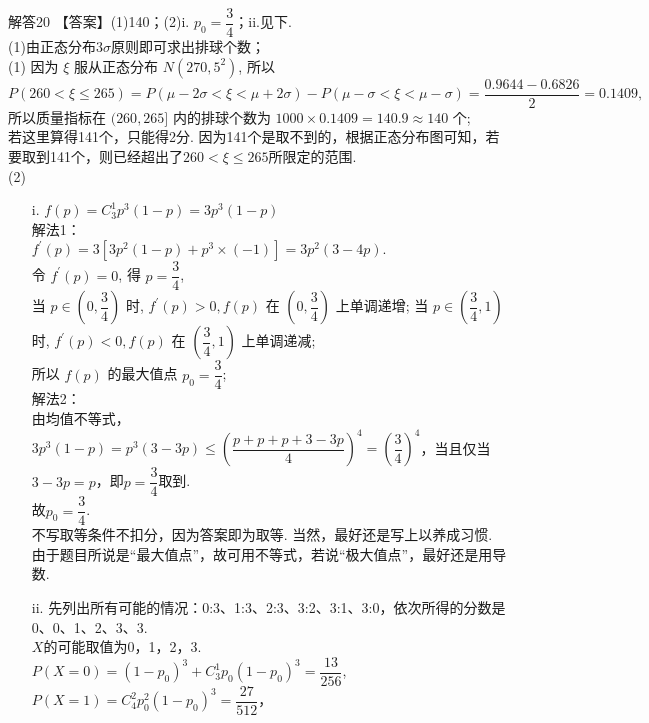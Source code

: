 \documentclass[11pt]{article}
\begin{document}
\heiti 解答20 \songti 【答案】(1)140；(2)i. $ p_0=\dfrac{3}{4} $；ii.见下.
\\ (1)\fangsong 由正态分布$ 3\sigma   $原则即可求出排球个数；
\\ \songti (1) 因为 $\xi$ 服从正态分布 $N\left(270,5^{2}\right)$, 所以
$P(260<\xi \leqslant 265)=P(\mu -2\sigma <\xi<\mu+2\sigma )-P(\mu-\sigma <\xi<\mu-\sigma )=\dfrac{0.9644-0.6826}{2}=0.1409,$ 
\\所以质量指标在 $(260,265]$ 内的排球个数为 $1000 \times 0.1409=140.9 \approx 140$ 个;
\\ \kaishu 若这里算得141个，只能得2分. 因为141个是取不到的，根据正态分布图可知，若要取到141个，则已经超出了$260<\xi\leqslant265$所限定的范围.
\\
(2)\songti 
\begin{enumerate}
	\item[i.] $f(p)=C_{3}^{1} p^{3}(1-p)=3 p^{3}(1-p)$
	\\ \heiti 解法1：\songti \\$f^{\prime}(p)=3\left[3 p^{2}(1-p)+p^{3} \times(-1)\right]=3 p^{2}(3-4 p)$.
	\\令 $f^{\prime}(p)=0$, 得 $p=\dfrac{3}{4}$,
	\\当 $p \in\left(0, \dfrac{3}{4}\right)$ 时, $f^{\prime}(p)>0, f(p)$ 在 $\left(0, \dfrac{3}{4}\right)$ 上单调递增;
	当 $p \in\left(\dfrac{3}{4}, 1\right)$ 时, $f^{\prime}(p)<0, f(p)$ 在 $\left(\dfrac{3}{4}, 1\right)$ 上单调递减;
	\\所以 $f(p)$ 的最大值点 $p_{0}=\dfrac{3}{4}$;
	\\ \heiti 解法2：\songti
	\\ 由均值不等式，$3p^3(1-p)=p^3(3-3p)\leqslant \left ( \dfrac{p+p+p+3-3p}{4}  \right )^4=\left ( \dfrac{3}{4}  \right )^4  $，当且仅当$3-3p=p$，即$p=\dfrac{3}{4}$取到. 
	\\故$p_0=\dfrac{3}{4}$. 
	\\ \kaishu 不写取等条件不扣分，因为答案即为取等. 当然，最好还是写上以养成习惯.
	\\ \fangsong 由于题目所说是“最大值点”，故可用不等式，若说“极大值点”，最好还是用导数.
	\item[ii.] \fangsong 先列出所有可能的情况：0:3、1:3、2:3、3:2、3:1、3:0，依次所得的分数是0、0、1、2、3、3.
	\\ \songti $X$的可能取值为0，1，2，3.
	\\ $ P(X=0)=(1-p_0)^3+C_3^1p_0(1-p_0)^3=\dfrac{13}{256}  $,
	\\ $ P(X=1)=C_4^2p_0^2(1-p_0)^3=\dfrac{27}{512}  $，

\end{enumerate}
\end{document}
